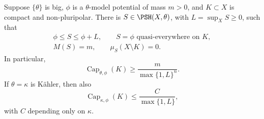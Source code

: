 \begin{lemma}\label{lem:penalized-compact-envelope}
Suppose $\{\theta\}$ is big, $\phi$ is a $\theta$-model potential of mass $m>0$, and $K\subset X$ is compact and non-pluripolar. There is $S\in\PSH(X,\theta)$, with $L=\sup_XS\geq0$, such that
\[
 \begin{gathered}
 \phi\leq S\leq\phi+L,\qquad S=\phi\text{ quasi-everywhere on }K,\\
 M(S)=m,\qquad\mu_S(X\setminus K)=0.
 \end{gathered}
\]
In particular,
\begin{equation}\label{eq:penalized-capacity-lower-bound}
 \operatorname{Cap}_{\theta,\phi}(K)
                      \geq\frac{m}{\max\{1,L\}^{n}}.
\end{equation}
If $\theta=\kappa$ is K\"ahler, then also
\begin{equation}\label{eq:penalized-capacity-upper-bound}
 \operatorname{Cap}_{\kappa,\phi}(K)
                      \leq\frac{C}{\max\{1,L\}},
\end{equation}
with $C$ depending only on $\kappa$.
\end{lemma}
